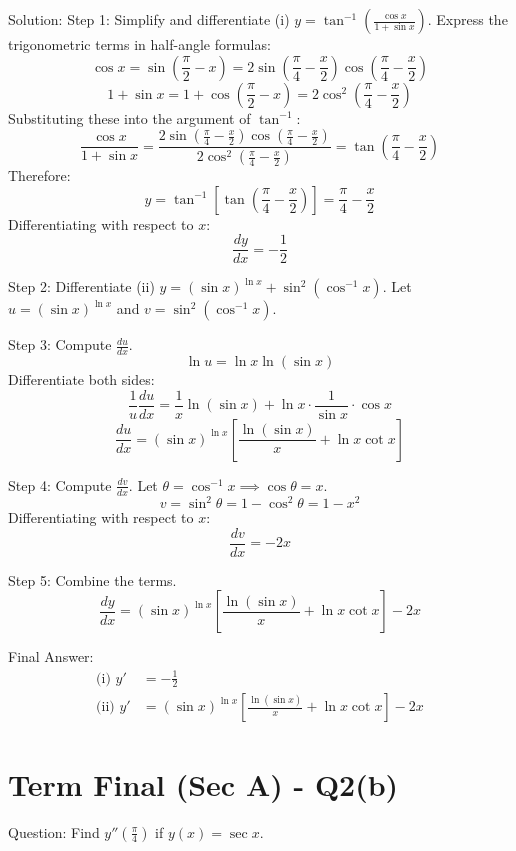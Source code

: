 \documentclass[11pt, a4paper]{article}
\begin{document}
Solution:
Step 1: Simplify and differentiate (i) $y = \tan^{-1}\left(\frac{\cos x}{1+\sin x}\right)$.
Express the trigonometric terms in half-angle formulas:
$$\cos x = \sin\left(\frac{\pi}{2} - x\right) = 2 \sin\left(\frac{\pi}{4} - \frac{x}{2}\right) \cos\left(\frac{\pi}{4} - \frac{x}{2}\right)$$
$$1 + \sin x = 1 + \cos\left(\frac{\pi}{2} - x\right) = 2 \cos^2\left(\frac{\pi}{4} - \frac{x}{2}\right)$$
Substituting these into the argument of $\tan^{-1}$:
$$\frac{\cos x}{1+\sin x} = \frac{2 \sin\left(\frac{\pi}{4} - \frac{x}{2}\right) \cos\left(\frac{\pi}{4} - \frac{x}{2}\right)}{2 \cos^2\left(\frac{\pi}{4} - \frac{x}{2}\right)} = \tan\left(\frac{\pi}{4} - \frac{x}{2}\right)$$
Therefore:
$$y = \tan^{-1}\left[\tan\left(\frac{\pi}{4} - \frac{x}{2}\right)\right] = \frac{\pi}{4} - \frac{x}{2}$$
Differentiating with respect to $x$:
$$\frac{dy}{dx} = -\frac{1}{2}$$

Step 2: Differentiate (ii) $y = (\sin x)^{\ln x} + \sin^2(\cos^{-1} x)$.
Let $u = (\sin x)^{\ln x}$ and $v = \sin^2(\cos^{-1} x)$.

Step 3: Compute $\frac{du}{dx}$.
$$\ln u = \ln x \ln(\sin x)$$
Differentiate both sides:
$$\frac{1}{u} \frac{du}{dx} = \frac{1}{x} \ln(\sin x) + \ln x \cdot \frac{1}{\sin x} \cdot \cos x$$
$$\frac{du}{dx} = (\sin x)^{\ln x} \left[ \frac{\ln(\sin x)}{x} + \ln x \cot x \right]$$

Step 4: Compute $\frac{dv}{dx}$.
Let $\theta = \cos^{-1} x \implies \cos \theta = x$.
$$v = \sin^2 \theta = 1 - \cos^2 \theta = 1 - x^2$$
Differentiating with respect to $x$:
$$\frac{dv}{dx} = -2x$$

Step 5: Combine the terms.
$$\frac{dy}{dx} = (\sin x)^{\ln x} \left[ \frac{\ln(\sin x)}{x} + \ln x \cot x \right] - 2x$$

Final Answer:
$$
\boxed{\begin{aligned}
\text{(i) } y' &= -\frac{1}{2} \\
\text{(ii) } y' &= (\sin x)^{\ln x} \left[ \frac{\ln(\sin x)}{x} + \ln x \cot x \right] - 2x
\end{aligned}}
$$


\section*{Term Final (Sec A) - Q2(b)}
Question:
Find $y''\left(\frac{\pi}{4}\right)$ if $y(x) = \sec x$.
\end{document}

